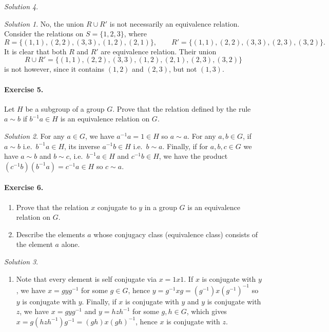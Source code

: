 \documentclass[11pt]{report}
\theoremstyle{remark}
\newtheorem*{solution}{Solution}
\begin{document}
\begin{solution}
\begin{solution}
        No, the union $R\cup R'$ is not necessarily an equivalence relation.
        Consider the relations on $S = \{1, 2, 3\}$, where \[
            R = \{(1, 1), (2, 2), (3, 3), (1, 2), (2, 1)\}, \qquad
            R' = \{(1, 1), (2, 2), (3, 3), (2, 3), (3, 2)\}. 
        \] It is clear that both $R$ and $R'$ are equivalence relation. Their union \[
            R \cup R' = \{(1, 1), (2, 2), (3, 3), (1, 2), (2, 1), (2, 3), (3, 2)\}
        \] is not however, since it contains $(1, 2)$ and $(2, 3)$, but not $(1, 3)$.
    \end{solution}
    
    \paragraph{Exercise 5.} Let $H$ be a subgroup of a group $G$. Prove that the
    relation defined by the rule $a \sim b$ if $b^{-1}a \in H$ is an equivalence
    relation on $G$.
    \begin{solution}
        For any $a \in G$, we have $a^{-1}a = 1 \in H$ so $a \sim a$. For any $a, b
        \in G$, if $a \sim b$ i.e.\ $b^{-1}a \in H$, its inverse $a^{-1}b \in H$
        i.e.\ $b \sim a$.  Finally, if for $a, b, c \in G$ we have $a \sim b$ and $b
        \sim c$, i.e.\ $b^{-1}a \in H$ and $c^{-1}b \in H$, we have the product
        $(c^{-1}b)(b^{-1}a) = c^{-1}a \in H$ so $c \sim a$.
    \end{solution}
    
    \paragraph{Exercise 6.} \mbox{}
    \begin{enumerate}
        \itemsep0em
        \item Prove that the relation $x$ conjugate to $y$ in a group $G$ is an
        equivalence relation on $G$.
        \item Describe the elements $a$ whose conjugacy class (equivalence class)
        consists of the element $a$ alone.
    \end{enumerate}
    \begin{solution} \mbox{}
    \begin{enumerate}
        \item Note that every element is self conjugate via $x = 1 x 1$. If $x$ is
        conjugate with $y$, we have $x = gyg^{-1}$ for some $g \in G$, hence $y =
        g^{-1}xg = (g^{-1})x(g^{-1})^{-1}$ so $y$ is conjugate with $y$. Finally, if
        $x$ is conjugate with $y$ and $y$ is conjugate with $z$, we have $x =
        gyg^{-1}$ and $y = hzh^{-1}$ for some $g, h \in G$, which gives $x =
        g(hzh^{-1})g^{-1} = (gh)x(gh)^{-1}$, hence $x$ is conjugate with $z$.


\end{enumerate}
\end{solution}
\end{solution}
\end{document}
